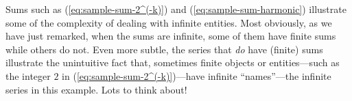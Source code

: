 \noindent {}
\medskip

Sums such as (\ref{eq:sample-sum-2^(-k)}) and
(\ref{eq:sample-sum-harmonic}) illustrate some of the complexity of
dealing with infinite entities.  Most obviously, as we have just
remarked, when the sums are infinite, some of them have finite sums
while others do not.  Even more subtle, the series that {\em do} have
(finite) sums illustrate the unintuitive fact that, sometimes finite
objects or entities---such as the integer $2$ in
(\ref{eq:sample-sum-2^(-k)})---have infinite ``names''---the infinite
series in this example.  Lots to think about!
\medskip

